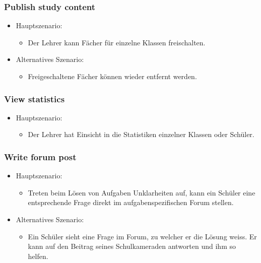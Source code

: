 \subsubsection*{Publish study content}
\begin{itemize}
	\item Hauptszenario:
	\begin{itemize}
		\item Der Lehrer kann Fächer für einzelne Klassen freischalten.
	\end{itemize}
	\item Alternatives Szenario:
	\begin{itemize}
		\item Freigeschaltene Fächer können wieder entfernt werden.
	\end{itemize}
\end{itemize}



\subsubsection*{View statistics}
\begin{itemize}
	\item Hauptszenario:
	\begin{itemize}
		\item Der Lehrer hat Einsicht in die Statistiken einzelner Klassen oder Schüler.
	\end{itemize}
\end{itemize}


\subsubsection*{Write forum post}
\begin{itemize}
	\item Hauptszenario:
	\begin{itemize}
		\item Treten beim Lösen von Aufgaben Unklarheiten auf, kann ein Schüler eine entsprechende Frage direkt im aufgabenspezifischen Forum stellen.
	\end{itemize}
	\item Alternatives Szenario:
	\begin{itemize}
		\item Ein Schüler sieht eine Frage im Forum, zu welcher er die Lösung weiss. Er kann auf den Beitrag seines Schulkameraden antworten und ihm so helfen.
	\end{itemize}
\end{itemize}


